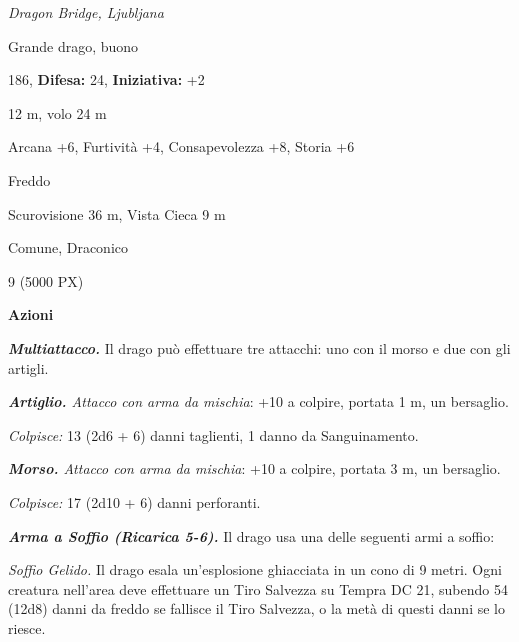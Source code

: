 \begin{multicols}{2}
{\begin{center}
	\emph{Dragon Bridge, Ljubljana}
\end{center}

\noindent
\begin{description}[noitemsep, topsep=0pt, parsep=0pt, partopsep=0pt, leftmargin=0cm, labelwidth=2.2cm]
	\item[\textbf{Taglia/Tipo:}] Grande drago, buono
	\item[\textbf{Caratt.:}] 
	\item[\textbf{Punti Ferita:}] 186,  \textbf{Difesa:} 24,  \textbf{Iniziativa:} +2
	\item[\textbf{Movimento:}] 12 m, volo 24 m
	\item[\textbf{Tiri Salvez.:}] 
	\item[\textbf{Comp.:}] Arcana +6, Furtività +4, Consapevolezza +8, Storia +6
	\item[\textbf{Imm. Danni:}] Freddo
	\item[\textbf{Sensi:}] Scurovisione 36 m, Vista Cieca 9 m
	\item[\textbf{Linguaggi:}] Comune, Draconico
	\item[\textbf{Sfida:}] 9 (5000 PX)\smallskip
\end{description}

\textbf{Azioni}

\emph{\textbf{Multiattacco.}} Il drago può effettuare tre attacchi: uno con il morso e due con gli artigli.

\emph{\textbf{Artiglio.} Attacco con arma da mischia}: +10 a colpire, portata 1 m, un bersaglio.

\emph{Colpisce:} 13 (2d6 + 6) danni taglienti, 1 danno da Sanguinamento.

\emph{\textbf{Morso.} Attacco con arma da mischia}: +10 a colpire, portata 3 m, un bersaglio.

\emph{Colpisce:} 17 (2d10 + 6) danni perforanti.

\emph{\textbf{Arma a Soffio (Ricarica 5-6).}} Il drago usa una delle seguenti armi a soffio:

\emph{Soffio Gelido.} Il drago esala un'esplosione ghiacciata in un cono di 9 metri. Ogni creatura nell'area deve effettuare un Tiro Salvezza su Tempra DC 21, subendo 54 (12d8) danni da freddo se fallisce il Tiro Salvezza, o la metà di questi danni se lo riesce.

}
\end{multicols}
